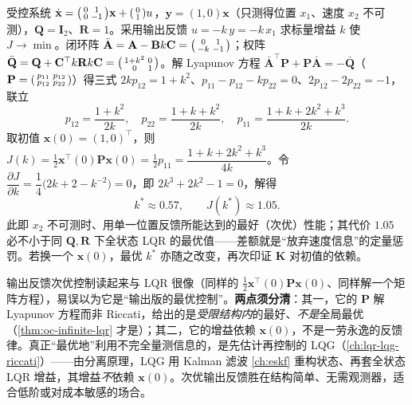 \begin{example}\label{ex:oc-subopt}
受控系统 $\dot{\mathbf x}=\begin{psmallmatrix}0&1\\0&-1\end{psmallmatrix}\mathbf x+\begin{psmallmatrix}0\\1\end{psmallmatrix}u$，$\mathbf y=(1,0)\mathbf x$（只测得位置 $x_1$、速度 $x_2$ 不可测），$\mathbf Q=\mathbf I_2$、$\mathbf R=1$。采用输出反馈 $u=-k\,y=-k\,x_1$ 求标量增益 $k$ 使 $J\to\min$。闭环阵 $\bar{\mathbf A}=\mathbf A-\mathbf B k\mathbf C=\begin{psmallmatrix}0&1\\-k&-1\end{psmallmatrix}$；权阵 $\bar{\mathbf Q}=\mathbf Q+\mathbf C^\top k\mathbf R k\mathbf C=\begin{psmallmatrix}1+k^2&0\\0&1\end{psmallmatrix}$。解 Lyapunov 方程 $\bar{\mathbf A}^\top\mathbf P+\mathbf P\bar{\mathbf A}=-\bar{\mathbf Q}$（$\mathbf P=\begin{psmallmatrix}p_{11}&p_{12}\\p_{12}&p_{22}\end{psmallmatrix}$）得三式 $2kp_{12}=1+k^2$、$p_{11}-p_{12}-kp_{22}=0$、$2p_{12}-2p_{22}=-1$，联立
\[
  p_{12}=\frac{1+k^2}{2k},\quad p_{22}=\frac{1+k+k^2}{2k},\quad p_{11}=\frac{1+k+2k^2+k^3}{2k}.
\]
取初值 $\mathbf x(0)=(1,0)^\top$，则 $J(k)=\tfrac12\mathbf x^\top(0)\mathbf P\mathbf x(0)=\tfrac12p_{11}=\dfrac{1+k+2k^2+k^3}{4k}$。令 $\dfrac{\partial J}{\partial k}=\dfrac14\big(2k+2-k^{-2}\big)=0$，即 $2k^3+2k^2-1=0$，解得
\begin{equation}
  k^*\approx0.57,\qquad J(k^*)\approx1.05.
  \label{eq:oc-subopt-result}
\end{equation}
此即 $x_2$ 不可测时、用单一位置反馈所能达到的最好（次优）性能；其代价 $1.05$ 必不小于同 $\mathbf Q,\mathbf R$ 下全状态 LQR 的最优值——差额就是“放弃速度信息”的定量惩罚。若换一个 $\mathbf x(0)$，最优 $k^*$ 亦随之改变，再次印证 $\mathbf K$ 对初值的依赖。
\end{example}

\begin{pitfall}
输出反馈次优控制读起来与 LQR 很像（同样的 $\tfrac12\mathbf x^\top(0)\mathbf P\mathbf x(0)$、同样解一个矩阵方程），易误以为它是“输出版的最优控制”。\textbf{两点须分清}：其一，它的 $\mathbf P$ 解 Lyapunov 方程而非 Riccati，给出的是\emph{受限结构内}的最好、\emph{不是}全局最优（\cref{thm:oc-infinite-lqr} 才是）；其二，它的增益依赖 $\mathbf x(0)$，不是一劳永逸的反馈律。真正“最优地”利用不完全量测信息的，是先估计再控制的 LQG（\cref{ch:lqr-lqg-riccati}）——由分离原理，LQG 用 Kalman 滤波 \cref{ch:eskf} 重构状态、再套全状态 LQR 增益，其增益\emph{不}依赖 $\mathbf x(0)$。次优输出反馈胜在结构简单、无需观测器，适合低阶或对成本敏感的场合。
\end{pitfall}


